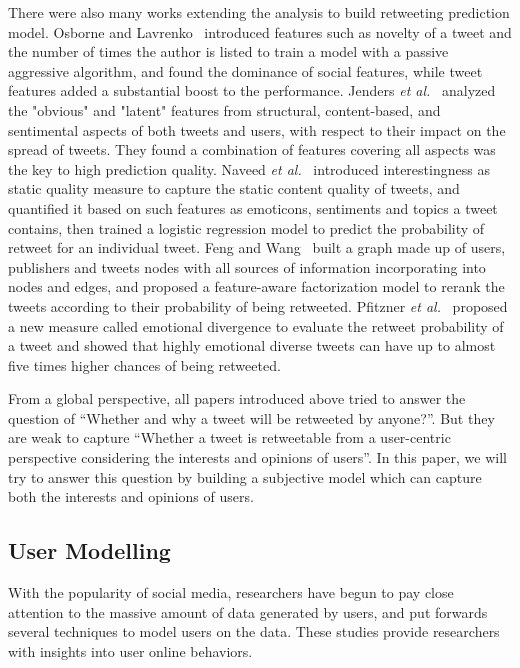 \documentclass{acm_proc_article-sp}
\begin{document}
There were also many works extending the analysis to build retweeting prediction model. 
Osborne and Lavrenko~\cite{petrovic2011rt} introduced features such as novelty of a tweet and the number of times the author is listed to train a model with a passive aggressive algorithm, and found the dominance of social features, while tweet features added a substantial boost to the performance.
Jenders \emph{et al.}~\cite{jenders2013analyzing} analyzed the "obvious" and "latent" features from structural, content-based, and sentimental aspects of both tweets and users, with respect to their impact on the spread of tweets. 
They found a combination of features covering all aspects was the key to high prediction quality.
Naveed \emph{et al.}~\cite{naveed2011searching,naveed2011bad} introduced interestingness as static quality measure to capture the static content quality of tweets, and quantified it based on such features as emoticons, sentiments and topics a tweet contains, then trained a logistic regression model to predict the probability of retweet for an individual tweet.
Feng and Wang~\cite{feng2013retweet} built a graph made up of users, publishers and tweets nodes with all sources of information incorporating into nodes and edges, and proposed a feature-aware factorization model to rerank the tweets according to their probability of being retweeted.
Pfitzner \emph{et al.}~\cite{pfitzner2012emotional} proposed a new measure called emotional divergence to evaluate the retweet probability of a tweet and showed that highly emotional diverse tweets can have up to almost five times higher chances of being retweeted.

From a global perspective, all papers introduced above tried to answer the question of ``Whether and why a tweet will be retweeted by anyone?''. 
But they are weak to capture ``Whether a tweet is retweetable from a user-centric perspective considering the interests and opinions of users''. 
In this paper, we will try to answer this question by building a subjective model which can capture both the interests and opinions of users.

\subsection{User Modelling}
With the popularity of social media, researchers have begun to pay close attention to the massive amount of data generated by users, and put forwards several techniques to model users on the data. These studies provide researchers with insights into user online behaviors. 
\end{document}
